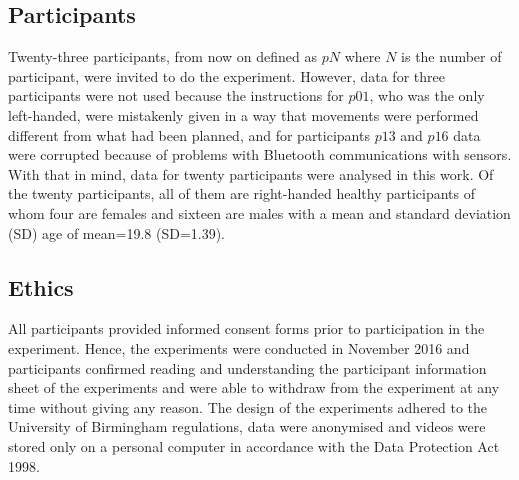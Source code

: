 \documentclass[fleqn,10pt]{wlscirep}
\begin{document}
\subsection*{Participants}
Twenty-three participants,
from now on defined as $pN$ where $N$ is the number of participant, were 
invited to do the experiment. However, data for three participants were 
not used because the instructions for $p01$, who was the only left-handed,
were mistakenly given in a way that movements were performed different
from what had been planned, and for participants $p13$ and $p16$ 
data were corrupted because of problems with Bluetooth communications with sensors. 
With that in mind, data for twenty participants were analysed in this work.
Of the twenty participants, all of them are right-handed healthy participants 
of whom four are females and sixteen are males with a mean and standard 
deviation (SD) age of mean=19.8 (SD=1.39). 

\subsection*{Ethics}
All participants provided informed consent forms prior to participation 
in the experiment. Hence, the experiments were conducted in November 2016 and 
participants confirmed reading and understanding the participant information sheet of the 
experiments and were able to withdraw from the experiment at any time without giving
any reason. The design of the experiments adhered to the University of Birmingham
regulations, data were anonymised and videos were stored only on a 
personal computer in accordance with the Data Protection Act 1998. 
\end{document}
